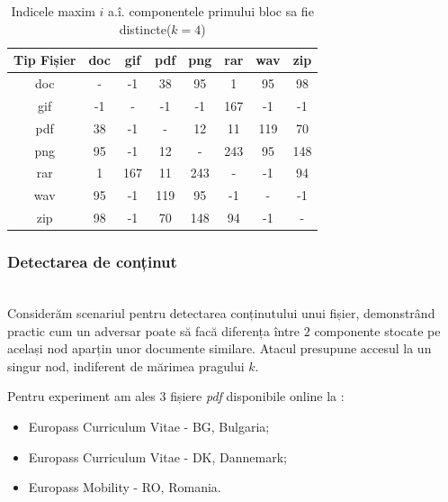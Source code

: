 \documentclass[oneside, 12pt]{book}
\begin{document}
\begin{table}[t]
\begin{center}
\caption{Indicele maxim $i$ a.î. componentele primului bloc sa fie distincte($k=4$)}\label{tb:margins}
\label{table:k4}
\begin{tabular}{cccccccc}
Tip Fișier & doc & gif & pdf & png & rar & wav & zip \\\hline
  doc & - & -1 & 38 & 95 & 1 & 95 & 98\\
  gif & -1 & - & -1 & -1 & 167 & -1 & -1\\
  pdf & 38 & -1 & - & 12 & 11 & 119 & 70\\
  png & 95 & -1 & 12 & - & 243 & 95 & 148\\
  rar & 1 & 167 & 11 & 243 & - & -1 & 94\\
  wav & 95 & -1 & 119 & 95 & -1 & - & -1\\
  zip & 98 & -1 & 70 & 148 & 94 & -1 & -\\ \hline
\end{tabular}
\end{center}
\bigskip
\end{table}

\subsubsection{Detectarea de conținut} \hspace*{\fill} \\

Considerăm scenariul pentru detectarea conținutului unui fișier, demonstrând practic cum un adversar poate să facă diferența între $2$ componente stocate pe același nod aparțin unor documente similare. Atacul presupune accesul la un singur nod, indiferent de mărimea pragului $k$.


Pentru experiment am ales $3$ fișiere \textit{pdf} disponibile online la {\cite{Europass:2015}}:
\begin{itemize}
  \item Europass Curriculum Vitae - BG, Bulgaria;
  \item Europass Curriculum Vitae - DK, Dannemark;
  \item Europass Mobility - RO, Romania.
\end{itemize}

\end{document}
